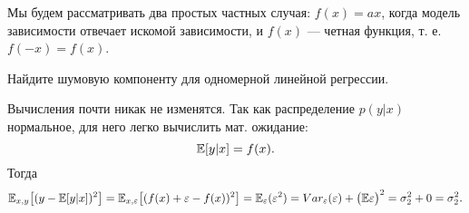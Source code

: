 \documentclass[12pt,fleqn]{article}
\begin{document}
Мы будем рассматривать два простых частных случая: $f(x) = ax$, когда модель зависимости отвечает искомой зависимости, и $f(x)$ --- четная функция, т. е. $f(-x) = f(x)$.  

\begin{vkProblem}
Найдите шумовую компоненту для одномерной линейной регрессии.
\end{vkProblem}
\begin{esSolution}
    Вычисления почти никак не изменятся. Так как распределение $p(y|x)$ нормальное, для него легко вычислить мат. ожидание:
    \[
    \mathbb{E}[y|x] = f(x).
    \]  
    Тогда
    \[
    \mathbb{E}_{x, y}\bigl[(y - \mathbb{E}[y|x] )^2\bigr] = 
    \mathbb{E}_{x, \varepsilon}\bigl[(f(x) + \varepsilon - f(x) )^2\bigr] = 
    \mathbb{E}_{\varepsilon} (\varepsilon^2) = Var_{\varepsilon}(\varepsilon) + \bigl(\mathbb{E}\varepsilon\bigr)^2 = \sigma_2^2 + 0 = \sigma_2^2.
    \]
\end{esSolution}
\end{document}
